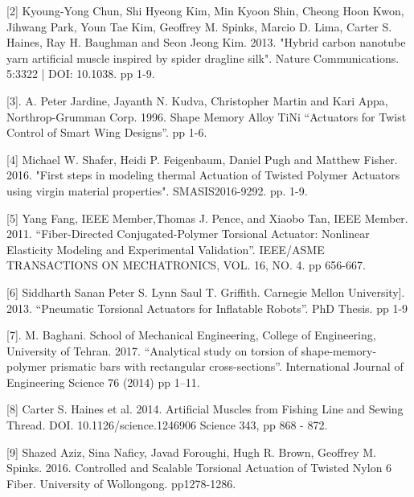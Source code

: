 \documentclass[12pt,oneside]{article}
\begin{document}
[2] Kyoung-Yong Chun, Shi Hyeong Kim, Min Kyoon Shin, Cheong Hoon Kwon, Jihwang Park, Youn Tae Kim, Geoffrey M. Spinks, Marcio D. Lima, Carter S. Haines, Ray H. Baughman and Seon Jeong Kim. 2013. "Hybrid carbon nanotube yarn artificial muscle inspired by spider dragline silk". Nature Communications. 5:3322 | DOI: 10.1038. pp 1-9.\par
\vspace{0.4cm}
[3]. A. Peter Jardine, Jayanth N. Kudva, Christopher Martin and Kari Appa, Northrop-Grumman Corp. 1996. Shape Memory Alloy TiNi “Actuators for Twist Control of Smart Wing Designs”. pp 1-6.\par
\vspace{0.4cm}
[4] Michael W. Shafer, Heidi P. Feigenbaum, Daniel Pugh and Matthew Fisher. 2016. "First steps in modeling thermal Actuation of Twisted Polymer Actuators using virgin material properties". SMASIS2016-9292. pp. 1-9.\par
\vspace{0.4cm}
[5] Yang Fang, IEEE Member,Thomas J. Pence, and Xiaobo Tan, IEEE Member. 2011. “Fiber-Directed Conjugated-Polymer Torsional Actuator: Nonlinear Elasticity Modeling and Experimental Validation”. IEEE/ASME TRANSACTIONS ON MECHATRONICS, VOL. 16, NO. 4. pp 656-667.\par
\vspace{0.4cm}
[6] Siddharth Sanan Peter S. Lynn Saul T. Griffith. Carnegie Mellon University]. 2013. “Pneumatic Torsional Actuators for Inflatable Robots”. PhD Thesis.  pp 1-9\par
\vspace{0.4cm}
[7]. M. Baghani. School of Mechanical Engineering, College of Engineering, University of Tehran. 2017. “Analytical study on torsion of shape-memory-polymer prismatic bars with rectangular cross-sections”. International Journal of Engineering Science 76 (2014) pp 1–11. \par
\vspace{0.4cm}
[8] Carter S. Haines et al. 2014. Artificial Muscles from Fishing Line and Sewing Thread.  DOI. 10.1126/science.1246906 Science 343, pp 868 - 872.\par
\vspace{0.4cm} 
[9] Shazed Aziz, Sina Naficy, Javad Foroughi, Hugh R. Brown, Geoffrey M. Spinks. 2016. Controlled and Scalable Torsional Actuation of Twisted Nylon 6 Fiber. University of Wollongong. pp1278-1286. \par
\end{document}
